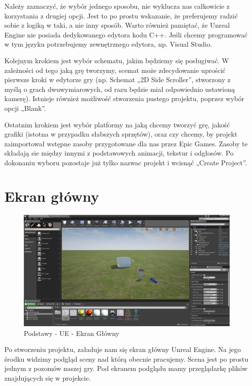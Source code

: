 \documentclass[brudnopis]{xmgr}
\begin{document}
Należy zaznaczyć, że wybór jednego sposobu, nie wyklucza nas całkowicie z korzystania z drugiej opcji. Jest to po prostu wskazanie, że preferujemy radzić sobie z logiką w taki, a nie inny sposób.
Warto również pamiętać, że Unreal Engine nie posiada dedykowanego edytora kodu C++. Jeśli chcemy programować w tym języku potrzebujemy zewnętrznego edytora, np. Visual Studio.

Kolejnym krokiem jest wybór schematu, jakim będziemy się posługiwać. W zależności od tego jaką grę tworzymy, scemat może zdecydowanie uprościć pierwsze kroki w edytorze gry (np. Schemat „2D Side Scroller”, stworzony z myślą o grach dwuwymiarowych, od razu będzie miał odpowiednio ustawioną kamerę). Istnieje również możliwość stworzenia pustego projektu, poprzez wybór opcji „Blank”.

Ostatnim krokiem jest wybór platformy na jaką chcemy tworzyć grę, jakość grafiki (istotna w przypadku słabszych sprzętów), oraz czy chcemy, by projekt zaimportował wstępne zasoby przygotowane dla nas przez Epic Games. Zasoby te składają sie między innymi z podstawowych animacji, tekstur i odgłosów.
Po dokonaniu wyboru pozostaje już tylko nazwac projekt i wcisnąć „Create Project”.

\newpage
\section{Ekran główny}

\begin{figure}[!htb]
    \begin{center}
    \includegraphics[scale=0.25]{Screeny/Main}
    \end{center}
    \caption{Podstawy - UE - Ekran Główny}
\end{figure}

Po stworzeniu projektu, załaduje nam się ekran główny Unreal Engine. Na jego środku widzimy podgląd sceny nad którą obecnie pracujemy. Scena jest po prostu jednym z pozomów naszej gry.
Pod ekranem podglądu mamy przeglądarkę plików znajdujących się w projekcie. 
\end{document}
